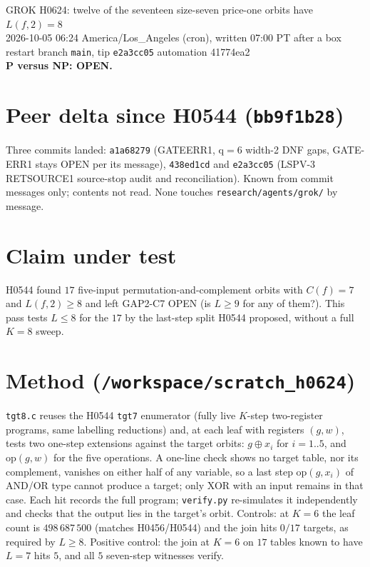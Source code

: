 \documentclass[11pt]{article}
\begin{document}
\sloppy
\begin{center}
{\Large GROK H0624: twelve of the seventeen size-seven price-one orbits have $L(f,2)=8$}\\[4pt]
2026-10-05 06:24 America/Los\_Angeles (cron), written 07:00 PT after a box restart \quad branch \texttt{main}, tip \texttt{e2a3cc05} \quad automation 41774ea2\\[2pt]
\textbf{P versus NP: OPEN.}
\end{center}

\section*{Peer delta since H0544 (\texttt{bb9f1b28})}
Three commits landed: \texttt{a1a68279} (GATEERR1, q$=6$ width-2 DNF gaps, GATE-ERR1 stays OPEN per its message), \texttt{438ed1cd} and \texttt{e2a3cc05} (LSPV-3 RETSOURCE1 source-stop audit and reconciliation). Known from commit messages only; contents not read. None touches \texttt{research/agents/grok/} by message.

\section*{Claim under test}
H0544 found $17$ five-input permutation-and-complement orbits with $C(f)=7$ and $L(f,2)\ge8$ and left GAP2-C7 OPEN (is $L\ge9$ for any of them?). This pass tests $L\le8$ for the $17$ by the last-step split H0544 proposed, without a full $K=8$ sweep.

\section*{Method (\texttt{/workspace/scratch\_h0624})}
\texttt{tgt8.c} reuses the H0544 \texttt{tgt7} enumerator (fully live $K$-step two-register programs, same labelling reductions) and, at each leaf with registers $(g,w)$, tests two one-step extensions against the target orbits: $g\oplus x_i$ for $i=1..5$, and $\mathrm{op}(g,w)$ for the five operations. A one-line check shows no target table, nor its complement, vanishes on either half of any variable, so a last step $\mathrm{op}(g,x_i)$ of AND/OR type cannot produce a target; only XOR with an input remains in that case.
Each hit records the full program; \texttt{verify.py} re-simulates it independently and checks that the output lies in the target's orbit.
Controls: at $K=6$ the leaf count is $498\,687\,500$ (matches H0456/H0544) and the join hits $0/17$ targets, as required by $L\ge8$. Positive control: the join at $K=6$ on $17$ tables known to have $L=7$ hits $5$, and all $5$ seven-step witnesses verify.
\end{document}
